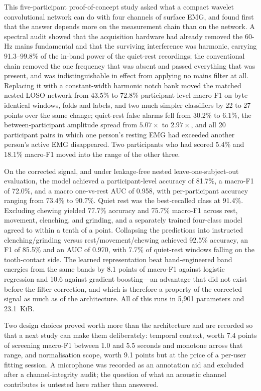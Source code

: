 \documentclass[pdflatex,sn-nature,iicol]{sn-jnl}
\begin{document}
This five-participant proof-of-concept study asked what a compact wavelet convolutional network can do with four channels of surface EMG, and found first that the answer depends more on the measurement chain than on the network. A spectral audit showed that the acquisition hardware had already removed the 60-Hz mains fundamental and that the surviving interference was harmonic, carrying 91.3--99.8\% of the in-band power of the quiet-rest recordings; the conventional chain removed the one frequency that was absent and passed everything that was present, and was indistinguishable in effect from applying no mains filter at all. Replacing it with a constant-width harmonic notch bank moved the matched nested-LOSO network from 43.5\% to 72.8\% participant-level macro-F1 on byte-identical windows, folds and labels, and two much simpler classifiers by 22 to 27 points over the same change; quiet-rest false alarms fell from 30.2\% to 6.1\%, the between-participant amplitude spread from $5.07\times$ to $2.97\times$, and all 20 participant pairs in which one person's resting EMG had exceeded another person's active EMG disappeared. Two participants who had scored 5.4\% and 18.1\% macro-F1 moved into the range of the other three.

On the corrected signal, and under leakage-free nested leave-one-subject-out evaluation, the model achieved a participant-level accuracy of 81.7\%, a macro-F1 of 72.0\%, and a macro one-vs-rest AUC of 0.958, with per-participant accuracy ranging from 73.4\% to 90.7\%. Quiet rest was the best-recalled class at 91.4\%. Excluding chewing yielded 77.7\% accuracy and 75.7\% macro-F1 across rest, movement, clenching, and grinding, and a separately trained four-class model agreed to within a tenth of a point. Collapsing the predictions into instructed clenching/grinding versus rest/movement/chewing achieved 92.5\% accuracy, an F1 of 85.5\% and an AUC of 0.970, with 7.7\% of quiet-rest windows falling on the tooth-contact side. The learned representation beat hand-engineered band energies from the same bands by 8.1 points of macro-F1 against logistic regression and 10.6 against gradient boosting---an advantage that did not exist before the filter correction, and which is therefore a property of the corrected signal as much as of the architecture. All of this runs in 5,901 parameters and 23.1~KiB.

Two design choices proved worth more than the architecture and are recorded so that a next study can make them deliberately: temporal context, worth 7.4 points of screening macro-F1 between 1.0 and 5.5 seconds and monotone across that range, and normalisation scope, worth 9.1 points but at the price of a per-user fitting session. A microphone was recorded as an annotation aid and excluded after a channel-integrity audit; the question of what an acoustic channel contributes is untested here rather than answered.
\end{document}
